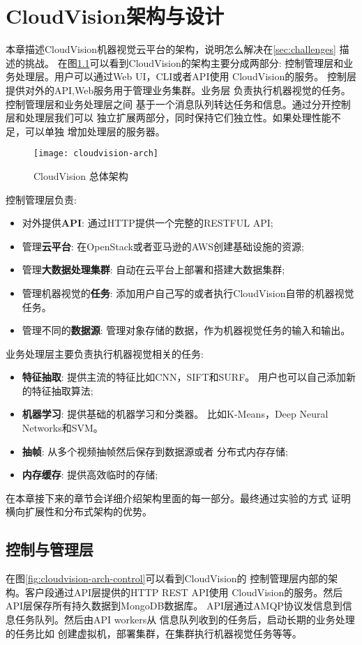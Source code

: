 \chapter{CloudVision架构与设计}
\label{cha:architecture}
本章描述CloudVision机器视觉云平台的架构，说明怎么解决在\ref{sec:challenges}
描述的挑战。
在图\ref{fig:cloudvision-arch}可以看到CloudVision的架构主要分成两部分:
控制管理层和业务处理层。用户可以通过Web UI，CLI或者API使用
CloudVision的服务。 控制层提供对外的API,Web服务用于管理业务集群。业务层
负责执行机器视觉的任务。控制管理层和业务处理层之间
基于一个消息队列转达任务和信息。通过分开控制层和处理层我们可以
独立扩展两部分，同时保持它们独立性。如果处理性能不足，可以单独
增加处理层的服务器。
\begin{figure}[H]
  \centering
  \texttt{[image: cloudvision-arch]}
  \caption{CloudVision 总体架构}
  \label{fig:cloudvision-arch}
\end{figure}

控制管理层负责:
\begin{itemize}
  \item 对外提供\textbf{API}: 通过HTTP提供一个完整的RESTFUL API;
  \item 管理\textbf{云平台}: 在OpenStack或者亚马逊的AWS创建基础设施的资源;
  \item 管理\textbf{大数据处理集群}: 自动在云平台上部署和搭建大数据集群;
  \item 管理机器视觉的\textbf{任务}: 添加用户自己写的或者执行CloudVision自带的机器视觉任务。
  \item 管理不同的\textbf{数据源}: 管理对象存储的数据，作为机器视觉任务的输入和输出。
\end{itemize}
业务处理层主要负责执行机器视觉相关的任务:
\begin{itemize}
  \item \textbf{特征抽取}: 提供主流的特征比如CNN，SIFT和SURF。
        用户也可以自己添加新的特征抽取算法;
  \item \textbf{机器学习}: 提供基础的机器学习和分类器。
        比如K-Means，Deep Neural Networks和SVM。
  \item \textbf{抽帧}: 从多个视频抽帧然后保存到数据源或者
        分布式内存存储;
  \item \textbf{内存缓存}: 提供高效临时的存储;
\end{itemize}

在本章接下来的章节会详细介绍架构里面的每一部分。最终通过实验的方式
证明横向扩展性和分布式架构的优势。


\section{控制与管理层}
\label{sec:arch_control}
在图\ref{fig:cloudvision-arch-control}可以看到CloudVision的
控制管理层内部的架构。客户段通过API层提供的HTTP REST API使用
CloudVision的服务。然后API层保存所有持久数据到MongoDB数据库。
API层通过AMQP协议发信息到信息任务队列。然后由API workers从
信息队列收到的任务后，启动长期的业务处理的任务比如
创建虚拟机，部署集群，在集群执行机器视觉任务等等。

